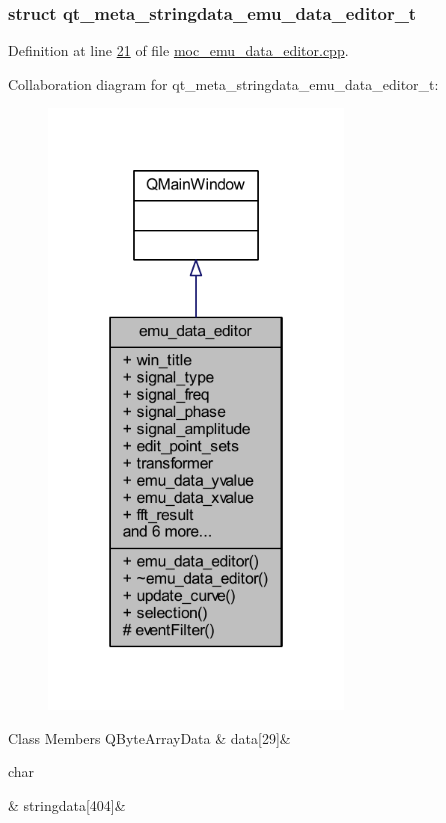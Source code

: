 \subsubsection{struct qt\+\_\+meta\+\_\+stringdata\+\_\+emu\+\_\+data\+\_\+editor\+\_\+t}


Definition at line \hyperlink{a00065_source_l00021}{21} of file \hyperlink{a00065_source}{moc\+\_\+emu\+\_\+data\+\_\+editor.\+cpp}.



Collaboration diagram for qt\+\_\+meta\+\_\+stringdata\+\_\+emu\+\_\+data\+\_\+editor\+\_\+t\+:
\nopagebreak
\begin{figure}[H]
\begin{center}
\leavevmode
\includegraphics[width=222pt]{d3/d58/a00285}
\end{center}
\end{figure}
\begin{DoxyFields}{Class Members}
\hypertarget{a00065_a91db052cb5a1fcce8e53e81902e8e90b}{Q\+Byte\+Array\+Data}\label{a00065_a91db052cb5a1fcce8e53e81902e8e90b}
&
data\mbox{[}29\mbox{]}&
\\
\hline

\hypertarget{a00065_ae988ab8add535bff49a0c5d5ec714851}{char}\label{a00065_ae988ab8add535bff49a0c5d5ec714851}
&
stringdata\mbox{[}404\mbox{]}&
\\
\hline

\end{DoxyFields}


